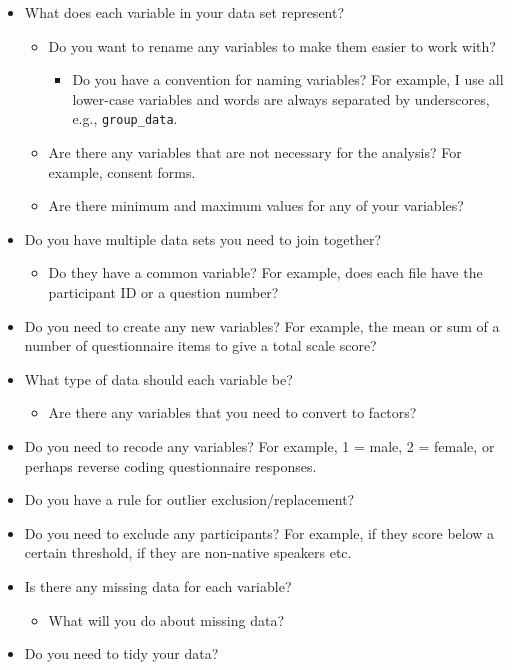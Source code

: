 \documentclass[]{book}
\providecommand{\tightlist}{%
  \setlength{\itemsep}{0pt}\setlength{\parskip}{0pt}}
\begin{document}
\begin{itemize}
\tightlist
\item
  What does each variable in your data set represent?

  \begin{itemize}
  \tightlist
  \item
    Do you want to rename any variables to make them easier to work with?

    \begin{itemize}
    \tightlist
    \item
      Do you have a convention for naming variables? For example, I use all lower-case variables and words are always separated by underscores, e.g., \texttt{group\_data}.\\
    \end{itemize}
  \item
    Are there any variables that are not necessary for the analysis? For example, consent forms.
  \item
    Are there minimum and maximum values for any of your variables?
  \end{itemize}
\item
  Do you have multiple data sets you need to join together?

  \begin{itemize}
  \tightlist
  \item
    Do they have a common variable? For example, does each file have the participant ID or a question number?
  \end{itemize}
\item
  Do you need to create any new variables? For example, the mean or sum of a number of questionnaire items to give a total scale score?\\
\item
  What type of data should each variable be?

  \begin{itemize}
  \tightlist
  \item
    Are there any variables that you need to convert to factors?\\
  \end{itemize}
\item
  Do you need to recode any variables? For example, 1 = male, 2 = female, or perhaps reverse coding questionnaire responses.
\item
  Do you have a rule for outlier exclusion/replacement?\\
\item
  Do you need to exclude any participants? For example, if they score below a certain threshold, if they are non-native speakers etc.
\item
  Is there any missing data for each variable?

  \begin{itemize}
  \tightlist
  \item
    What will you do about missing data?
  \end{itemize}
\item
  Do you need to tidy your data?
\end{itemize}
\end{document}
